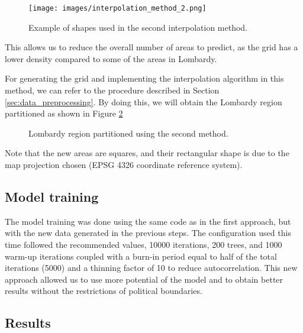 \documentclass[11pt,a4paper]{article}
\begin{document}
\begin{figure}[H]
    \centering
    \texttt{[image: images/interpolation\_method\_2.png]}
    \captionsetup{font=small}
    \caption{Example of shapes used in the second interpolation method.}
    \label{fig:example_method_2}
\end{figure}

This allows us to reduce the overall number of areas to predict, as the grid has a lower density compared to some of the areas in Lombardy.

For generating the grid and implementing the interpolation algorithm in this method, we can refer to the procedure described in Section \ref{sec:data_preprocessing}.
By doing this, we will obtain the Lombardy region partitioned as shown in Figure \ref{fig:lombary_method_2}

\begin{figure}[H]
    \centering
    \hfill
    \caption{Lombardy region partitioned using the second method.}
    \label{fig:lombary_method_2}
\end{figure}

Note that the new areas are squares, and their rectangular shape is due to the map projection chosen (EPSG 4326 coordinate reference system).

\subsection{Model training}

The model training was done using the same code as in the first approach, but with the new data generated in the previous steps. The configuration used this time followed the recommended values, 10000 iterations, 200 trees, and 1000 warm-up iterations coupled with a burn-in period equal to half of the total iterations (5000) and a thinning factor of 10 to reduce autocorrelation. This new approach allowed us to use more potential of the model and to obtain better results without the restrictions of political boundaries.

\subsection{Results}
\end{document}
